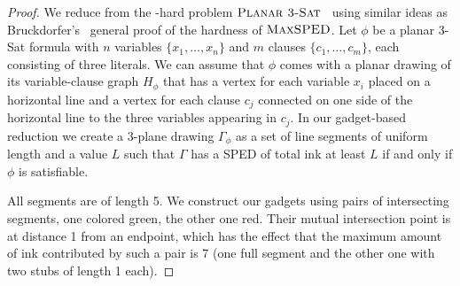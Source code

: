 \documentclass[a4paper,english,numberwithinsect]{eurocg18}
\newcommand{\maxsped}{\ensuremath{\textsc{MaxSPED}}\xspace}
\newcommand{\ppsat}{\ensuremath{\textsc{Planar 3-Sat}}\xspace}
\begin{document}
\begin{proof}
	We reduce from the \NP-hard problem \ppsat~\cite{l-pftu-82} using similar ideas as Bruckdorfer's~\cite{b-sgh-15} general proof of the hardness of \maxsped. %
	Let $\phi$ be a planar 3-Sat formula with $n$ variables $\{x_1, \dots, x_n\}$ and $m$ clauses $\{c_1, \dots, c_m\}$, each consisting of three literals.
	We can assume that $\phi$ comes with a planar drawing of its variable-clause graph $H_\phi$ that has a vertex for each variable $x_i$ placed on a horizontal line and a vertex for each clause $c_j$ connected on one side of the horizontal line to the three variables appearing in $c_j$. 
	In our gadget-based reduction we create a 3-plane drawing $\Gamma_\phi$ as a set of line segments of uniform length and a value $L$ such that $\Gamma$ has a SPED of total ink at least $L$ if and only if $\phi$ is satisfiable.
	
	All segments are of length 5.
	We construct our gadgets using pairs of intersecting segments, one colored green, the other one red.
	Their mutual intersection point is at distance 1 from an endpoint, which has the effect that the maximum amount of ink contributed by such a pair is 7 (one full segment and the other one with two stubs of length 1 each).
	




\end{proof}
\end{document}
